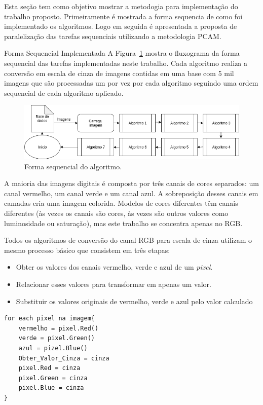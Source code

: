 Esta seção tem como objetivo mostrar a metodogia para implementação do trabalho
proposto. Primeiramente é mostrada a forma sequencia de como foi implementado os
algoritmos. Logo em seguida é apresentada a proposta de paralelização das tarefas
sequenciais utilizando a metodologia PCAM.

\begin{subsection}{Forma Sequencial Implementada}
A Figura~\ref{fig:gray} mostra o fluxograma da forma sequencial das tarefas
implementadas neste trabalho. Cada algoritmo realiza a conversão em escala de
cinza de imagens contidas em uma base com 5 mil imagens que são processadas um
por vez por cada algoritmo seguindo uma ordem sequencial de cada algoritmo
aplicado.  

\begin{figure}[!h]
	\centering
	\includegraphics[width=0.95\linewidth]{figs/Sequential.png}
	\caption{Forma sequencial do algoritmo.}
	\label{fig:gray}
\end{figure}



A maioria das imagens digitais é composta por três canais de cores separados: um
canal vermelho, um canal verde e um canal azul. A sobreposição desses canais em
camadas cria uma imagem colorida. Modelos de cores diferentes têm canais
diferentes (às vezes os canais são cores, às vezes são outros valores como
luminosidade ou saturação), mas este trabalho se concentra apenas no RGB.

Todos os algoritmos de conversão do canal RGB para escala de cinza utilizam 
o mesmo processo básico que consistem em três etapas:

\begin{itemize}
\item Obter os valores dos canais vermelho, verde e azul de um \textit{pixel}.
\item Relacionar esses valores para transformar em apenas um valor.
\item Substituir os valores originais de vermelho, verde e azul pelo valor calculado
\end{itemize}


\begin{lstlisting}
for each pixel na imagem{
	vermelho = pixel.Red()
	verde = pixel.Green()
	azul = pizel.Blue()
	Obter_Valor_Cinza = cinza
	pixel.Red = cinza
	pixel.Green = cinza
	pixel.Blue = cinza
}
\end{lstlisting}



\end{subsection}
